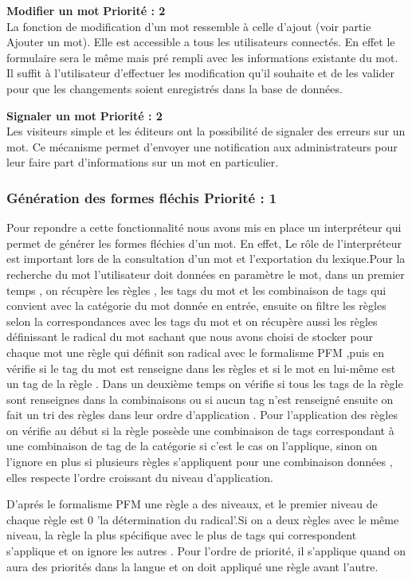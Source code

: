 \documentclass[12pt,a4paper]{article}
\begin{document}
\textbf{Modifier un mot}
 \textbf{Priorité : 2} \\ 
 La fonction de modification d'un mot ressemble à celle d'ajout (voir partie Ajouter un mot). Elle est accessible a tous les utilisateurs connectés. En effet le formulaire sera le même mais pré rempli avec les informations existante du mot. Il suffit à  l'utilisateur d'effectuer les modification qu'il souhaite et de les valider pour que les changements soient enregistrés dans la base de données.

\textbf{Signaler un mot}
 \textbf{Priorité : 2}
 \\ Les visiteurs simple et les éditeurs ont la possibilité de signaler des erreurs sur un mot. Ce mécanisme permet d'envoyer une notification aux administrateurs pour leur faire part d'informations sur un mot en particulier. 
 \subsubsection{Génération des formes fléchis  Priorité : 1} 
Pour repondre a cette fonctionnalité nous avons mis en place un interpréteur qui permet de générer les formes fléchies d'un mot.
En effet, Le rôle de l'interpréteur est important lors de la consultation d'un mot et l'exportation du lexique.Pour la recherche du mot l'utilisateur doit données en paramètre le mot, dans un premier temps , on récupère les règles , les tags du mot et les combinaison de tags qui convient avec la catégorie du mot donnée en entrée, ensuite on filtre les règles selon la correspondances avec les tags du mot et on récupère aussi les règles définissant le radical du mot sachant que nous avons choisi de stocker pour chaque mot une règle qui définit son radical avec le formalisme PFM ,puis en vérifie si le tag du mot est renseigne dans les règles et si le mot en lui-même est un tag de la règle . 
Dans un deuxième temps on vérifie si tous les tags de la règle sont renseignes dans la combinaisons ou si aucun tag n'est renseigné ensuite on fait un tri des règles dans leur ordre d'application .
Pour l'application des règles on vérifie au début si la règle possède une combinaison de tags correspondant à une combinaison de tag de la catégorie si c'est le cas on l'applique, sinon on l'ignore en plus si plusieurs règles s'appliquent pour une combinaison données , elles respecte l'ordre croissant du niveau d'application.

 D'aprés le formalisme PFM une règle a des niveaux, et le premier niveau de chaque règle est 0 'la détermination du radical'.Si on a deux règles  avec le même niveau, la règle la plus spécifique avec le plus de tags qui correspondent s'applique et on ignore les autres . Pour l'ordre de priorité, il s'applique quand on aura des priorités dans la langue et on doit appliqué une règle avant l'autre. 
\end{document}
